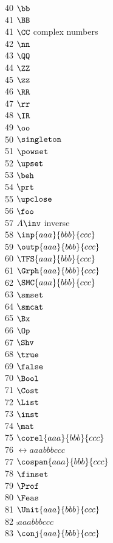 \documentclass[11pt, book]{memoir}
\begin{document}
\begin{multicols}{3}
 40 $\bb$ \\
 41 $\BB$ \\
 41 $\CC$ complex numbers \\
 42 $\nn$ \\
 43 $\QQ$ \\
 44 $\ZZ$ \\
 45 $\zz$ \\
 46 $\RR$ \\
 47 $\rr$ \\
 48 $\IR$ \\
 49 $\oo$ \\
 50 $\singleton$ \\
 51 $\powset$ \\
 52 $\upset$ \\
 53 $\beh$ \\
 54 $\prt$ \\
 55 $\upclose$ \\
 56 $\foo$ \\
 57 $A\inv$ inverse \\
 58 $\inp{aaa}{bbb}{ccc}$ \\
 59 $\outp{aaa}{bbb}{ccc}$ \\
 60 $\TFS{aaa}{bbb}{ccc}$ \\
 61 $\Grph{aaa}{bbb}{ccc}$ \\
 62 $\SMC{aaa}{bbb}{ccc}$ \\
 63 $\smset$ \\
 64 $\smcat$ \\
 65 $\Bx$ \\
 66 $\Op$ \\
 67 $\Shv$ \\
 68 $\true$ \\
 69 $\false$ \\
 70 $\Bool$ \\
 71 $\Cost$ \\
 72 $\List$ \\
 73 $\inst$ \\
 74 $\mat$ \\
 75 $\corel{aaa}{bbb}{ccc}$ \\
 76 $\rel{aaa}{bbb}{ccc}$ \\
 77 $\cospan{aaa}{bbb}{ccc}$ \\
 78 $\finset$ \\
 79 $\Prof$ \\
 80 $\Feas$ \\
 81 $\Unit{aaa}{bbb}{ccc}$ \\
 82 $\comp{aaa}{bbb}{ccc}$ \\
 83 $\conj{aaa}{bbb}{ccc}$ \\

\end{multicols}
\end{document}
